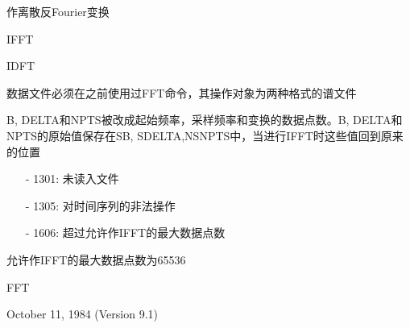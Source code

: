 \label{cmd:ifft}

作离散反Fourier变换

IFFT

IDFT

数据文件必须在之前使用过FFT命令，其操作对象为两种格式的谱文件

B, DELTA和NPTS被改成起始频率，采样频率和变换的数据点数。B, DELTA和NPTS的原始值保存在SB, SDELTA,NSNPTS中，当进行IFFT时这些值回到原来的位置

\begin{itemize}
\item[-]1301: 未读入文件
\item[-] 1305: 对时间序列的非法操作
\item[-]1606: 超过允许作IFFT的最大数据点数
\end{itemize}

允许作IFFT的最大数据点数为65536

FFT

October 11, 1984 (Version 9.1)
